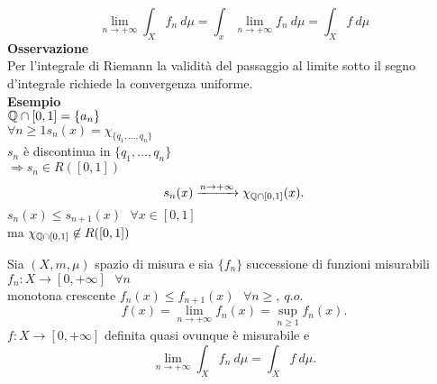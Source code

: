 \documentclass[12px]{article}
\begin{document}
	\[\lim_{n \rightarrow +\infty}\int_X f_n \ d\mu = \int_x \lim_{n \rightarrow +\infty} f_n \ d\mu = \int_X f\ d\mu\]
	\textbf{Osservazione}\\
	Per l'integrale di Riemann la validità del passaggio al limite sotto il segno d'integrale richiede la convergenza uniforme.\\
	\textbf{Esempio}\\
	$\mathbb{Q}\cap [0,1] = \{a_n\}$\\
	$\forall n\geq 1 s_n(x) = \chi_{\{q_1,\ldots,q_n\}}$\\
		$s_n$ è discontinua in $\{q_1,\ldots,q_n\}$\\
		$ \Rightarrow  s_n\in R([0,1])$ \\
		\[
			s_n(x) \xrightarrow{n \rightarrow+\infty} \chi_{\mathbb{Q}\cap [0,1]}(x)
		.\] 
		$s_n(x)\leq s_{n+1}(x) \ \ \ \forall x\in [0,1]$\\
		ma $\chi_{\mathbb{Q}\cap [0,1]}\not\in R([0,1])$
		\begin{teo}
			Sia $(X,m,\mu)$ spazio di misura e sia $\{f_n\}$ successione di funzioni misurabili\\
			$f_n: X \rightarrow [0,+\infty]\ \ \ \forall n$\\
			monotona crescente $f_n(x) \leq f_{n+1}(x) \ \ \ \forall n\geq , \ q.o.$
			 \[
				 f(x) = \lim_{n \rightarrow+\infty} f_n(x) = \sup_{n\geq 1} f_n(x)
			.\] 
			$f:X \rightarrow [0,+\infty]$ definita quasi ovunque è misurabile e 
			\[
				\lim_{n \rightarrow+\infty} \int_X f_n\ d\mu = \int_X f \ d\mu
			.\] 
		\end{teo}
\end{document}
